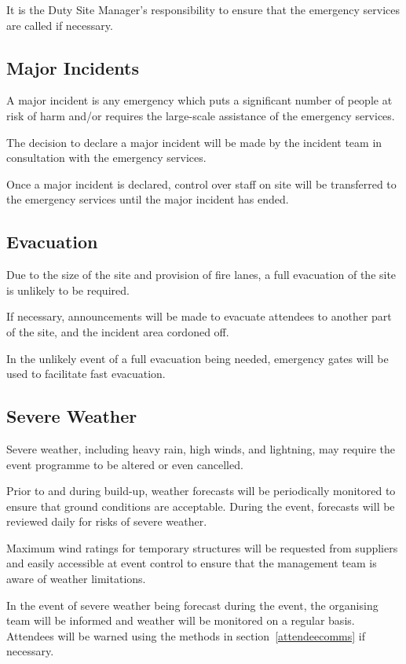 It is the Duty Site Manager's responsibility to ensure that the emergency services
are called if necessary.

\subsection{Major Incidents}
A major incident is any emergency which puts a significant number of people at risk
of harm and/or requires the large-scale assistance of the emergency services.

The decision to declare a major incident will be made by the incident team in
consultation with the emergency services.

Once a major incident is declared, control over staff on site will be transferred
to the emergency services until the major incident has ended.

\subsection{Evacuation}
Due to the size of the site and provision of fire lanes, a full evacuation of the site
is unlikely to be required.

If necessary, announcements will be made to evacuate attendees to another part of the
site, and the incident area cordoned off.

In the unlikely event of a full evacuation being needed, emergency gates will be used
to facilitate fast evacuation.

\subsection{Severe Weather}
Severe weather, including heavy rain, high winds, and lightning, may require the event
programme to be altered or even cancelled.

Prior to and during build-up, weather forecasts will be periodically monitored to ensure
that ground conditions are acceptable. During the event, forecasts will be reviewed
daily for risks of severe weather.

Maximum wind ratings for temporary structures will be requested from suppliers and
easily accessible at event control to ensure that the management team is aware of weather
limitations.

In the event of severe weather being forecast during the event, the organising team will
be informed and weather will be monitored on a regular basis. Attendees will be warned
using the methods in section~\ref{attendeecomms} if necessary.


